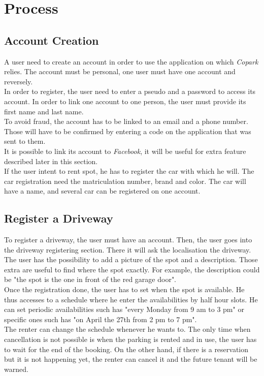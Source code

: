 \documentclass[12pt,a4paper,oneside]{book}
\newcommand{\bp}{\textit{Copark }}
\begin{document}
\section{Process}

\subsection{Account Creation}
A user need to create an account in order to use the application on which \bp relies. The account must be personal, one user must have one account and reversely.\\
In order to register, the user need to enter a pseudo and a password to access its account. In order to link one account to one person, the user must provide its first name and last name.\\
To avoid fraud, the account has to be linked to an email and a phone number. Those will have to be confirmed by entering a code on the application that was sent to them.\\
It is possible to link its account to \textit{Facebook}, it will be useful for extra feature described later in this section.\\

If the user intent to rent spot, he has to register the car with which he will. The car registration need the matriculation number, brand and color. The car will have a name, and several car can be registered on one account.

\subsection{Register a Driveway}
To register a driveway, the user must have an account. Then, the user goes into the driveway registering section. There it will ask the localisation the driveway. The user has the possibility to add a picture of the spot and a description. Those extra are useful to find where the spot exactly. For example, the description could be "the spot is the one in front of the red garage door".\\

Once the registration done, the user has to set when the spot is available. He thus accesses to a schedule where he enter the availabilities by half hour slots. He can set periodic availabilities such has "every Monday from 9 am to 3 pm" or specific ones such has "on April the 27th from 2 pm to 7 pm".\\

The renter can change the schedule whenever he wants to. The only time when cancellation is not possible is when the parking is rented and in use, the user has to wait for the end of the booking. On the other hand, if there is a reservation but it is not happening yet, the renter can cancel it and the future tenant will be warned.\\
\end{document}

